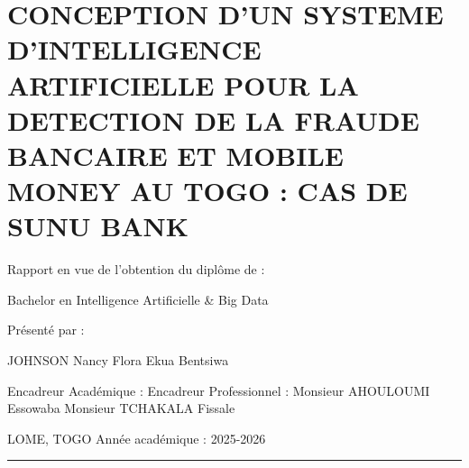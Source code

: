 \documentclass[
  12pt,
]{article}
\author{}
\date{}
\begin{document}
{
\setcounter{tocdepth}{3}
\tableofcontents
}
\section{CONCEPTION D’UN SYSTEME D’INTELLIGENCE ARTIFICIELLE POUR LA
DETECTION DE LA FRAUDE BANCAIRE ET MOBILE MONEY AU TOGO : CAS DE SUNU
BANK}\label{conception-dun-systeme-dintelligence-artificielle-pour-la-detection-de-la-fraude-bancaire-et-mobile-money-au-togo-cas-de-sunu-bank}

Rapport en vue de l’obtention du diplôme de :

Bachelor en Intelligence Artificielle \& Big Data

Présenté par :

JOHNSON Nancy Flora Ekua Bentsiwa

Encadreur Académique : Encadreur Professionnel : Monsieur AHOULOUMI
Essowaba Monsieur TCHAKALA Fissale

LOME, TOGO Année académique : 2025-2026

\begin{center}\rule{0.5\linewidth}{0.5pt}\end{center}
\end{document}
